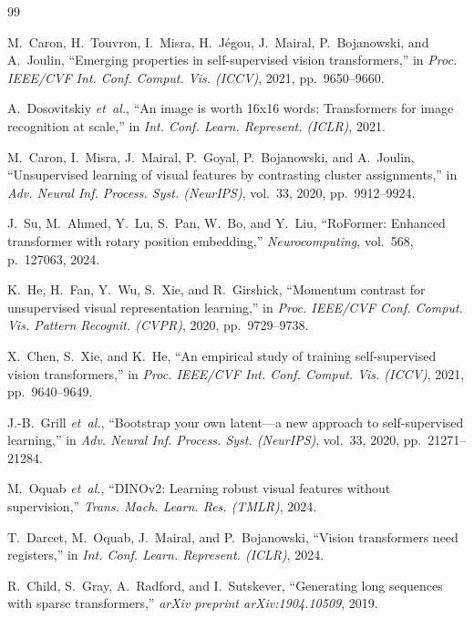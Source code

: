 \documentclass[11pt,a4paper]{article}
\begin{document}
\begin{thebibliography}{99}

M.~Caron, H.~Touvron, I.~Misra, H.~J{\'e}gou, J.~Mairal, P.~Bojanowski, and A.~Joulin,
``Emerging properties in self-supervised vision transformers,''
in \emph{Proc. IEEE/CVF Int. Conf. Comput. Vis. (ICCV)}, 2021, pp.~9650--9660.

A.~Dosovitskiy \emph{et~al.},
``An image is worth 16x16 words: Transformers for image recognition at scale,''
in \emph{Int. Conf. Learn. Represent. (ICLR)}, 2021.

M.~Caron, I.~Misra, J.~Mairal, P.~Goyal, P.~Bojanowski, and A.~Joulin,
``Unsupervised learning of visual features by contrasting cluster assignments,''
in \emph{Adv. Neural Inf. Process. Syst. (NeurIPS)}, vol.~33, 2020, pp.~9912--9924.

J.~Su, M.~Ahmed, Y.~Lu, S.~Pan, W.~Bo, and Y.~Liu,
``RoFormer: Enhanced transformer with rotary position embedding,''
\emph{Neurocomputing}, vol.~568, p.~127063, 2024.

K.~He, H.~Fan, Y.~Wu, S.~Xie, and R.~Girshick,
``Momentum contrast for unsupervised visual representation learning,''
in \emph{Proc. IEEE/CVF Conf. Comput. Vis. Pattern Recognit. (CVPR)}, 2020, pp.~9729--9738.

X.~Chen, S.~Xie, and K.~He,
``An empirical study of training self-supervised vision transformers,''
in \emph{Proc. IEEE/CVF Int. Conf. Comput. Vis. (ICCV)}, 2021, pp.~9640--9649.

J.-B.~Grill \emph{et~al.},
``Bootstrap your own latent---a new approach to self-supervised learning,''
in \emph{Adv. Neural Inf. Process. Syst. (NeurIPS)}, vol.~33, 2020, pp.~21271--21284.

M.~Oquab \emph{et~al.},
``DINOv2: Learning robust visual features without supervision,''
\emph{Trans. Mach. Learn. Res. (TMLR)}, 2024.

T.~Darcet, M.~Oquab, J.~Mairal, and P.~Bojanowski,
``Vision transformers need registers,''
in \emph{Int. Conf. Learn. Represent. (ICLR)}, 2024.

R.~Child, S.~Gray, A.~Radford, and I.~Sutskever,
``Generating long sequences with sparse transformers,''
\emph{arXiv preprint arXiv:1904.10509}, 2019.


\end{thebibliography}
\end{document}

